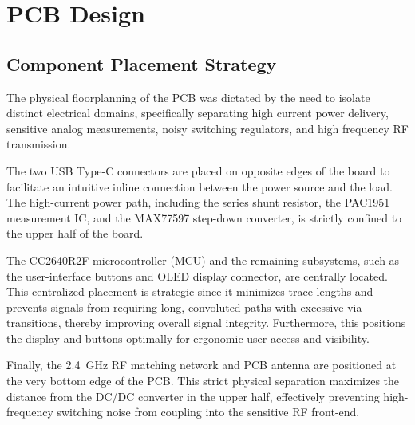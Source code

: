 \newpage
\section{PCB Design}


\subsection{Component Placement Strategy}\label{component_placement_strategy}
The physical floorplanning of the PCB was dictated by the need to isolate distinct electrical domains, specifically separating high current power delivery, sensitive analog measurements, noisy switching regulators, and high frequency RF transmission. 

The two USB Type-C connectors are placed on opposite edges of the board to facilitate an intuitive inline connection between the power source and the load. The high-current power path, including the series shunt resistor, the PAC1951 measurement IC, and the MAX77597 step-down converter, is strictly confined to the upper half of the board. 

The CC2640R2F microcontroller (MCU) and the remaining subsystems, such as the user-interface buttons and OLED display connector, are centrally located. This centralized placement is strategic since it minimizes trace lengths and prevents signals from requiring long, convoluted paths with excessive via transitions, thereby improving overall signal integrity. Furthermore, this positions the display and buttons optimally for ergonomic user access and visibility.

Finally, the \SI{2.4}{\giga\hertz} RF matching network and PCB antenna are positioned at the very bottom edge of the PCB. This strict physical separation maximizes the distance from the DC/DC converter in the upper half, effectively preventing high-frequency switching noise from coupling into the sensitive RF front-end.

